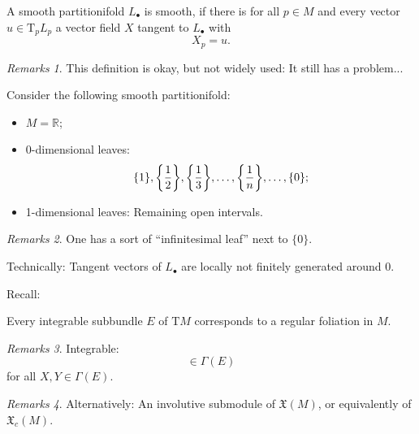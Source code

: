 \documentclass[hyperref={pdfpagelabels=false}]{beamer}
\def\bes{\begin{equation*}}
\def\ees{\end{equation*}}
\theoremstyle{plain}
\theoremstyle{remark}
\newtheorem*{remark}{Remarks}
\begin{document}
\begin{frame}
\begin{definition}
A smooth partitionifold $L_\bullet$ is smooth, if there is for all $p \in M$ and every vector $u \in \mathrm{T}_p L_p$ a vector field $X$ tangent to $L_\bullet$ with
\bes
X_p = u.
\ees
\end{definition}

\pause

\begin{remark}
This definition is okay, but not widely used: It still has a problem...
\end{remark}
\end{frame}

{
\begin{frame}

\begin{example}
Consider the following smooth partitionifold:
\begin{itemize}
	\item $M = \mathbb{R}$;
	\item 0-dimensional leaves:
	\bes
	\{1\}, \mleft\{\frac{1}{2}\mright\}, \mleft\{\frac{1}{3}\mright\}, \dots, \mleft\{\frac{1}{n}\mright\}, \dots, \{0\};
	\ees
	\item 1-dimensional leaves: Remaining open intervals.
\end{itemize}
\end{example}

\pause

\begin{remark}
One has a sort of ``infinitesimal leaf'' next to $\{0\}$. 

Technically: Tangent vectors of $L_\bullet$ are locally not finitely generated around 0.
\end{remark}
\end{frame}

\begin{frame}
Recall:

\begin{theorem}
Every integrable subbundle $E$ of $\mathrm{T} M$ corresponds to a regular foliation in $M$.
\end{theorem}

\begin{remark}
Integrable:
\bes
[X, Y] \in \Gamma(E)
\ees
for all $X, Y \in \Gamma(E)$.
\end{remark}
\pause
\begin{remark}
Alternatively: An involutive submodule of $\mathfrak{X}(M)$, or equivalently of $\mathfrak{X}_c(M)$.
\end{remark}
\end{frame}
}
\end{document}
